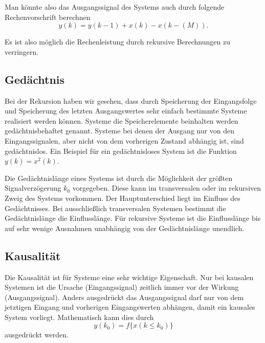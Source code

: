 Man könnte also das Ausgangssignal des Systems auch durch folgende
Rechenvorschrift berechnen
\begin{equation} \label{eq:RekursionsBsp}
    y(k) = y(k-1) + x(k) - x(k-(M)).
\end{equation}

Es ist also möglich die Rechenleistung durch rekursive
Berechnungen zu verringern.

\subsection{Gedächtnis}
Bei der Rekursion haben wir gesehen, dass durch Speicherung der
Eingangsfolge und Speicherung des letzten Ausgangswertes sehr
einfach bestimmte Systeme realisiert werden können. Systeme die
Speicherelemente beinhalten werden gedächtnisbehaftet genannt.
Systeme bei denen der Ausgang nur von den Eingangssignalen, aber
nicht von dem vorherigen Zustand abhängig ist, sind gedächtnislos.
Ein Beispiel für ein gedächtnisloses System ist die Funktion $y(k)
= x^2(k)$.


Die Gedächtnislänge eines Systems ist
durch die Möglichkeit der größten Signalverzögerung $k_0$
vorgegeben. Diese kann im transversalen oder im rekursiven Zweig
des Systems vorkommen. Der Hauptunterschied liegt im Einfluss des Gedächtnisses.
Bei ausschließlich transversalen Systemen bestimmt die Gedächtnislänge die
Einflusslänge. Für rekursive Systeme ist die Einflusslänge bis auf sehr wenige Ausnahmen unabhängig
von der Gedächtnislänge unendlich.

\subsection{Kausalität}
Die Kausalität ist für Systeme eine sehr wichtige Eigenschaft. Nur
bei kausalen Systemen ist die Ursache (Eingangssignal) zeitlich
immer vor der Wirkung (Ausgangssignal). Anders ausgedrückt das
Ausgangssignal darf nur von dem jetztigen Eingang und vorherigen
Eingangswerten abhängen, damit ein kausales System vorliegt.
Mathematisch kann dies durch
\begin{equation}
    y(k_0) = f\{x(k\leq k_0)\}
\end{equation}
ausgedrückt werden.

